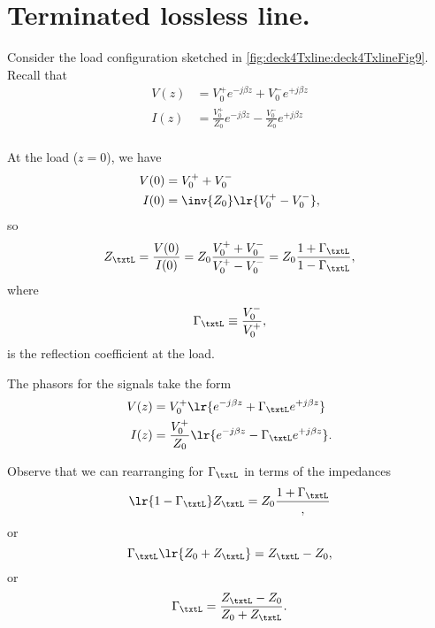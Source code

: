 \section{Terminated lossless line.}
Consider the load configuration sketched in \cref{fig:deck4Txline:deck4TxlineFig9}.
Recall that
\begin{equation}\label{eqn:uwaves4TransmissionLines:840}
\begin{aligned}
V(z) &= V_0^{+} e^{-j \beta z} + V_0^{-} e^{+j \beta z} \\
I(z) &= \frac{V_0^{+}}{Z_0} e^{-j \beta z} - \frac{V_0^{-}}{Z_0} e^{+j \beta z} \\
\end{aligned}
\end{equation}

At the load (\( z = 0 \)), we have
\begin{equation}\label{eqn:uwaves4TransmissionLines:860}
\begin{aligned}
V(0) &= V_0^{+} + V_0^{-} \\
I(0) &= \inv{Z_0} \lr{ V_0^{+} - V_0^{-} },
\end{aligned}
\end{equation}
so
\begin{dmath}\label{eqn:uwaves4TransmissionLines:880}
Z_\txtL
= \frac{V(0)}{I(0)}
= Z_0 \frac{ V_0^{+} + V_0^{-} }{ V_0^{+} - V_0^{-} }
= Z_0 \frac{ 1 + \Gamma_\txtL }{1 - \Gamma_\txtL },
\end{dmath}
where
\begin{equation}\label{eqn:uwaves4TransmissionLines:900}
\Gamma_\txtL \equiv \frac{V_0^{-} }{V_0^{+}},
\end{equation}
is the reflection coefficient at the load.

The phasors for the signals take the form
\begin{equation}\label{eqn:uwaves4TransmissionLines:920}
\begin{aligned}
V(z) &= V_0^{+} \lr{ e^{-j \beta z} + \Gamma_\txtL e^{+j \beta z} } \\
I(z) &= \frac{V_0^{+}}{Z_0} \lr{ e^{-j \beta z} - \Gamma_\txtL e^{+j \beta z} }.
\end{aligned}
\end{equation}

Observe that we can rearranging for \( \Gamma_\txtL \) in terms of the impedances
\begin{dmath}\label{eqn:uwaves4TransmissionLines:940}
\lr{ 1 - \Gamma_\txtL } Z_\txtL = Z_0 \frac{ 1 + \Gamma_\txtL },
\end{dmath}
or
\begin{dmath}\label{eqn:uwaves4TransmissionLines:960}
\Gamma_\txtL \lr{ Z_0 + Z_\txtL } = Z_\txtL - Z_0,
\end{dmath}
or
\begin{dmath}\label{eqn:uwaves4TransmissionLines:980}
\Gamma_\txtL
= \frac{Z_\txtL - Z_0}
{ Z_0 + Z_\txtL } .
\end{dmath}
